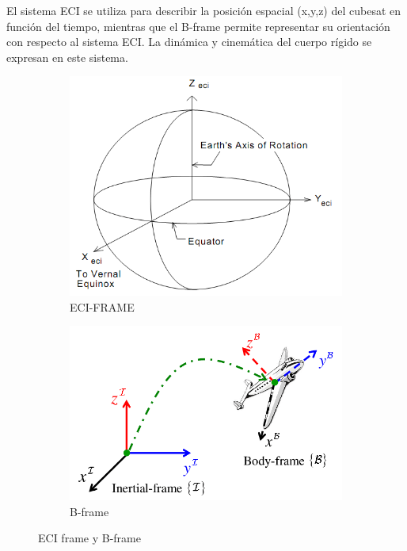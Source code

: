 El sistema ECI se utiliza para describir la posición espacial 
(x,y,z) del cubesat en función del tiempo, mientras que el B-frame permite representar su orientación con respecto al sistema ECI. La dinámica y cinemática del cuerpo rígido se expresan en este sistema.


\begin{figure}[!htpb]
	
	\begin{subfigure}[b]{0.49\linewidth}
		\includegraphics[width=\linewidth,height=0.25\textheight]{./Figures/ECI-frame.png}
		
		\caption{ECI-FRAME}
		\label{fig:ECI-frame}
	\end{subfigure}
	\hfill
	\begin{subfigure}[b]{0.49\linewidth}
		\includegraphics[width=\linewidth, height=0.25\textheight]{./Figures/B-frame.png}
		
		\caption{B-frame}
		\label{fig:B-frame}
	\end{subfigure}
	\caption{ECI frame y B-frame}
	\label{fig:B-frame-ECI-FRAME}
\end{figure}


